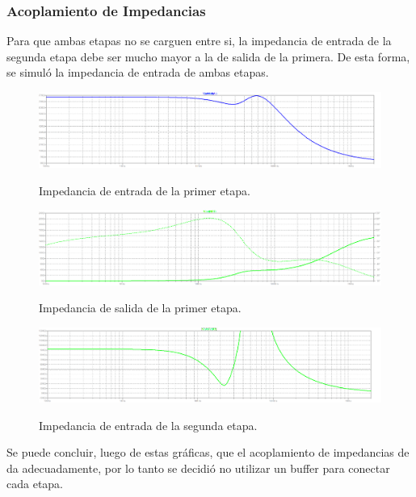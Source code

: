 \subsubsection{Acoplamiento de Impedancias}
Para que ambas etapas no se carguen entre si, la impedancia de entrada de la segunda etapa debe ser mucho mayor a la de salida de la primera. De esta forma, se simuló la impedancia de entrada de ambas etapas.
\begin{figure}[H]
	\centering
	\includegraphics[width=\textwidth]{Imagenes-Ej3/ZinE1.png}
	\label{fig:zine1}
	\caption{Impedancia de entrada de la primer etapa.}
\end{figure}
\begin{figure}[H]
	\centering
	\includegraphics[width=\textwidth]{Imagenes-Ej3/ZoutE1.png}
	\label{fig:zoute1}
	\caption{Impedancia de salida de la primer etapa.}
\end{figure}
\begin{figure}[H]
	\centering
	\includegraphics[width=\textwidth]{Imagenes-Ej3/ZinE2.png}
	\label{fig:zine2}
	\caption{Impedancia de entrada de la segunda etapa.}
\end{figure}

Se puede concluir, luego de estas gráficas, que el acoplamiento de impedancias de da adecuadamente, por lo tanto se decidió no utilizar un buffer para conectar cada etapa.

